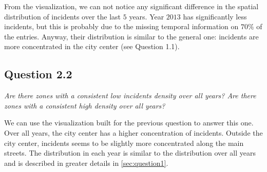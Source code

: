 From the visualization, we can not notice any significant difference in the spatial distribution of incidents over the last $5$ years.
Year $2013$ has significantly less incidents, but this is probably due to the missing temporal information on $70\%$ of the entries.
Anyway, their distribution is similar to the general one: incidents are more concentrated in the city center (see Question 1.1).


\subsection*{Question 2.2}
\textit{Are there zones with a consistent low incidents density over all years? Are there zones with a consistent high density over all years?}

We can use the visualization built for the previous question to answer this one.
Over all years, the city center has a higher concentration of incidents.
Outside the city center, incidents seems to be slightly more concentrated along the main streets.
The distribution in each year is similar to the distribution over all years and is described in greater details in \cref{sec:question1}.
